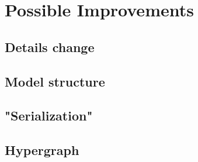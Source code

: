 \documentclass{article}
\begin{document}
\section{Possible Improvements}
\subsection{Details change}
\subsection{Model structure}
\subsection{"Serialization"}
\subsection{Hypergraph}



\end{document}
